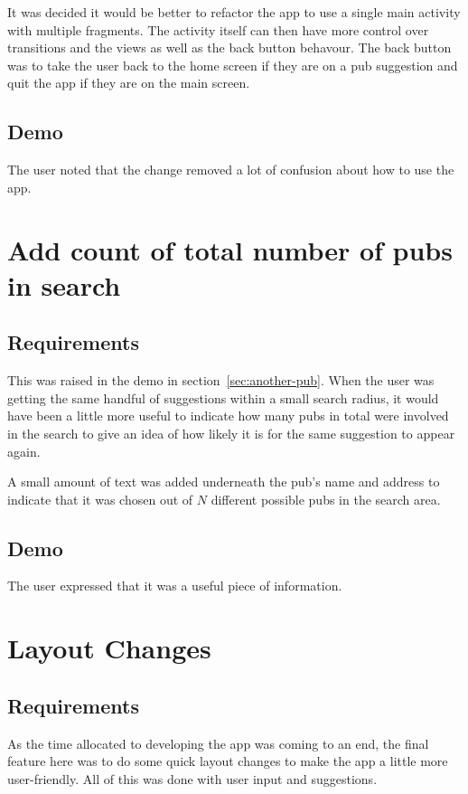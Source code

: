 \documentclass{report}
\begin{document}
It was decided it would be better to refactor the app to use
a single main activity with multiple fragments. The activity
itself can then have more control over transitions and the views
as well as the back button behavour. The back button was to
take the user back to the home screen if they are on a pub
suggestion and quit the app if they are on the main screen.

\subsection{Demo}

The user noted that the change removed a lot of confusion about
how to use the app.

\section{Add count of total number of pubs in search}

\subsection{Requirements}

This was raised in the demo in section~\ref{sec:another-pub}. When
the user was getting the same handful of suggestions within a small
search radius, it would have been a little more useful to indicate
how many pubs in total were involved in the search to give an
idea of how likely it is for the same suggestion to appear again.

A small amount of text was added underneath the pub's name and
address to indicate that it was chosen out of $N$ different
possible pubs in the search area.

\subsection{Demo}

The user expressed that it was a useful piece of information.

\section{Layout Changes}
\subsection{Requirements}
As the time allocated to developing the app was coming to an end, the
final feature here was to do some quick layout changes to make the
app a little more user-friendly. All of this was done with user
input and suggestions.
\end{document}
